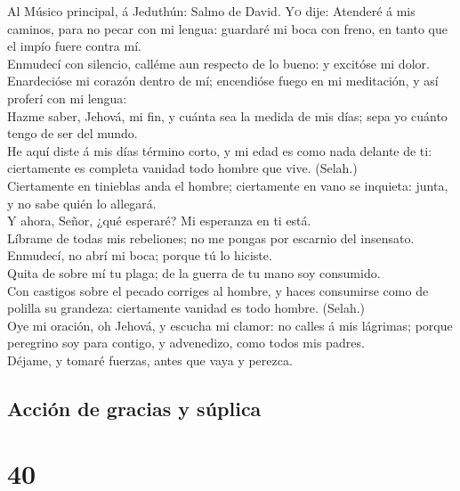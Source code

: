  Al Músico principal, á Jeduthún: Salmo de David.
\textsc{Yo} dije: Atenderé á mis caminos, para no pecar con mi lengua:
guardaré mi boca con freno, en tanto que el impío fuere contra mí.\\
 Enmudecí con silencio, calléme aun respecto de lo bueno:
y excitóse mi dolor.\\
 Enardecióse mi corazón dentro de mí; encendióse fuego en
mi meditación, y así proferí con mi lengua:\\
 Hazme saber, Jehová, mi fin, y cuánta sea la medida de
mis días; sepa yo cuánto tengo de ser del mundo.\\
 He aquí diste á mis días término corto, y mi edad es como
nada delante de ti: ciertamente es completa vanidad todo hombre que
vive. (Selah.)\\
 Ciertamente en tinieblas anda el hombre; ciertamente en
vano se inquieta: junta, y no sabe quién lo allegará.\\
 Y ahora, Señor, ¿qué esperaré? Mi esperanza en ti está.\\
 Líbrame de todas mis rebeliones; no me pongas por
escarnio del insensato.\\
 Enmudecí, no abrí mi boca; porque tú lo hiciste.\\
 Quita de sobre mí tu plaga; de la guerra de tu mano soy
consumido.\\
 Con castigos sobre el pecado corriges al hombre, y haces
consumirse como de polilla su grandeza: ciertamente vanidad es todo
hombre. (Selah.)\\
 Oye mi oración, oh Jehová, y escucha mi clamor: no
calles á mis lágrimas; porque peregrino soy para contigo, y advenedizo,
como todos mis padres.\\
 Déjame, y tomaré fuerzas, antes que vaya y perezca.

\hypertarget{acciuxf3n-de-gracias-y-suxfaplica}{%
\subsection{Acción de gracias y
súplica}\label{acciuxf3n-de-gracias-y-suxfaplica}}

\hypertarget{section-39}{%
\section{40}\label{section-39}}

